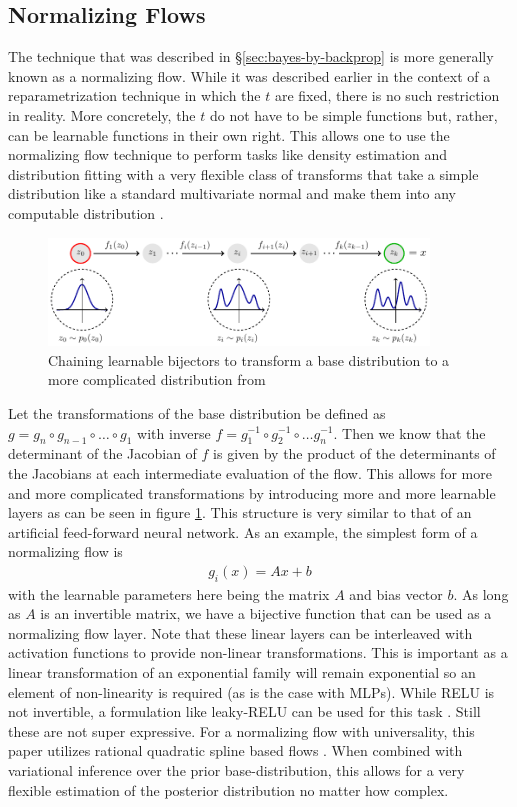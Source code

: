 \subsection{Normalizing Flows}
\label{sec:normalizing-flows}
The technique that was described in \S\ref{sec:bayes-by-backprop} is more generally known as a normalizing flow. While it was described earlier in the context of a reparametrization technique in which the $t$ are fixed, there is no such restriction in reality. More concretely, the $t$ do not have to be simple functions but, rather, can be learnable functions in their own right. This allows one to use the normalizing flow technique to perform tasks like density estimation and distribution fitting with a very flexible class of transforms that take a simple distribution like a standard multivariate normal and make them into any computable distribution \cite{kobyzev_normalizing_2021}.
\begin{figure}[t]
  \centering
  \includegraphics[width=0.9\textwidth]{images/nf.pdf}
  \caption{Chaining learnable bijectors to transform a base distribution to a more complicated distribution from \cite{weng_flow-based_2018}}
  \label{fig:nf}
\end{figure}
Let the transformations of the base distribution be defined as $g = g_n \circ g_{n-1} \circ \dots \circ g_1$ with inverse $f = g_1^{-1} \circ g_2^{-1} \circ \dots g_n^{-1}$. Then we know that the determinant of the Jacobian of $f$ is given by the product of the determinants of the Jacobians at each intermediate evaluation of the flow. This allows for more and more complicated transformations by introducing more and more learnable layers as can be seen in figure \ref{fig:nf}. This structure is very similar to that of an artificial feed-forward neural network. As an example, the simplest form of a normalizing flow is
\begin{align*}
  g_i(x) = Ax + b
\end{align*}
with the learnable parameters here being the matrix $A$ and bias vector $b$. As long as $A$ is an invertible matrix, we have a bijective function that can be used as a normalizing flow layer. Note that these linear layers can be interleaved with activation functions to provide non-linear transformations. This is important as a linear transformation of an exponential family will remain exponential so an element of non-linearity is required (as is the case with MLPs). While RELU is not invertible, a formulation like leaky-RELU can be used for this task \cite{xu_empirical_2015}. Still these are not super expressive. For a normalizing flow with universality, this paper utilizes rational quadratic spline based flows \cite{durkan_neural_2019}. When combined with variational inference over the prior base-distribution, this allows for a very flexible estimation of the posterior distribution no matter how complex.
\newpage
